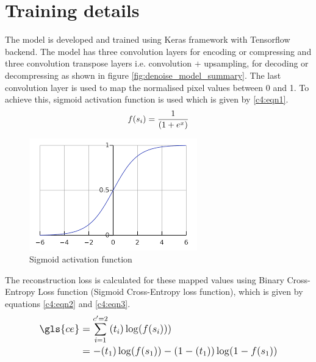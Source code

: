 \section{Training details}
The model is developed and trained using Keras framework with Tensorflow backend. The model has three convolution layers for encoding or compressing and three convolution transpose layers i.e. convolution $+$ upsampling, for decoding or decompressing as shown in figure \ref{fig:denoise_model_summary}. The last convolution layer is used to map the normalised pixel values between 0 and 1. To achieve this, sigmoid activation function is used which is given by \ref{c4:eqn1}.\\
\begin{equation}
\label{c4:eqn1}
\fontsize{12}{12}\selectfont
f(s_{i}) = \frac{1}{(1+e^{x})}
\end{equation}
\begin{figure}[H]
\centering
	\includegraphics[scale=1]{Figures/sigmoid.png}	
	\caption{Sigmoid activation function}
	\label{fig:Sigmoid}
\end{figure}
The reconstruction loss is calculated for these mapped values using Binary Cross-Entropy Loss function (Sigmoid Cross-Entropy loss function), which is given by equations \ref{c4:eqn2} and \ref{c4:eqn3}.
\begin{equation}
\label{c4:eqn2}
\fontsize{12}{12}\selectfont
\begin{aligned}
\gls{ce} 
& = \sum_{i=1}^{c'=2}{(t_{i})\log(f(s_{i})))}\\
& = -{(t_{1})\log(f(s_{1}))} - ({1 - (t_{1}))\log(1 - f(s_{1}))}
\end{aligned}
\end{equation}

